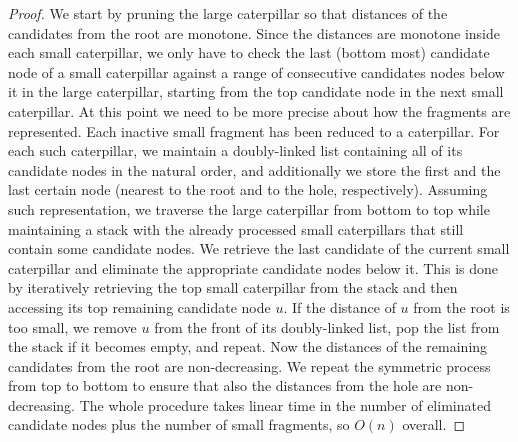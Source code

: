 \documentclass[11pt,a4paper]{article}
\theoremstyle{definition}
\theoremstyle{remark}
\begin{document}
\begin{proof}

We start by pruning the large caterpillar so that distances of the candidates from the root are
monotone. Since the distances are monotone inside each small caterpillar, we only have to check the last (bottom most) 
candidate node of a small caterpillar against a range of consecutive candidates nodes below it in the large
caterpillar, starting from the top candidate node in the next small caterpillar. 
At this point we need to be more precise about how the fragments are represented. Each inactive small
fragment has been reduced to a caterpillar. For each such caterpillar, we maintain a doubly-linked list containing
all of its candidate nodes in the natural order, and additionally we store the first and the last certain
node (nearest to the root and to the hole, respectively). Assuming such representation, we traverse
the large caterpillar from bottom to top while
maintaining a stack with the already processed small caterpillars that still contain some candidate nodes.
We retrieve the last candidate of the current small caterpillar and eliminate the appropriate candidate
nodes below it. This is done by iteratively retrieving the top small caterpillar from the stack and then
accessing its top remaining candidate node $u$. If the distance of $u$ from the root is too small, we
remove $u$ from the front of its doubly-linked list, pop the list from the stack if it becomes empty,
and repeat. Now the distances of the remaining candidates from the root are
non-decreasing. We repeat the symmetric process from top to bottom to ensure that also the distances
from the hole are non-decreasing. The whole procedure takes linear time in the number of eliminated
candidate nodes plus the number of small fragments, so $O(n)$ overall.


\end{proof}
\end{document}
